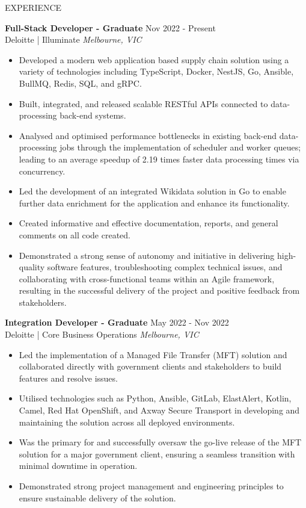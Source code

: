 \documentclass{resume} %
\begin{document}
\begin{rSection}{EXPERIENCE}

\textbf{Full-Stack Developer - Graduate} \hfill Nov 2022 - Present\\
Deloitte | Illuminate \hfill \textit{Melbourne, VIC}
 \begin{itemize}
    \itemsep -3pt {} 
    \item Developed a modern web application based supply chain solution using a variety of technologies including TypeScript, Docker, NestJS, Go, Ansible, BullMQ, Redis, SQL, and gRPC.
    \item Built, integrated, and released scalable RESTful APIs connected to data-processing back-end systems.
    \item Analysed and optimised performance bottlenecks in existing back-end data-processing jobs through the implementation of scheduler and worker queues; leading to an average speedup of 2.19 times faster data processing times via concurrency.
    \item Led the development of an integrated Wikidata solution in Go to enable further data enrichment for the application and enhance its functionality.
    \item Created informative and effective documentation, reports, and general comments on all code created.
    \item Demonstrated a strong sense of autonomy and initiative in delivering high-quality software features, troubleshooting complex technical issues, and collaborating with cross-functional teams within an Agile framework, resulting in the successful delivery of the project and positive feedback from stakeholders.
 \end{itemize}
 
\textbf{Integration Developer - Graduate} \hfill May 2022 - Nov 2022\\
Deloitte | Core Business Operations \hfill \textit{Melbourne, VIC}
 \begin{itemize}
    \itemsep -3pt {} 
    \item Led the implementation of a Managed File Transfer (MFT) solution and collaborated directly with government clients and stakeholders to build features and resolve issues.
    \item Utilised technologies such as Python, Ansible, GitLab, ElastAlert, Kotlin, Camel, Red Hat OpenShift, and Axway Secure Transport in developing and maintaining the solution across all deployed environments.
    \item Was the primary for and successfully oversaw the go-live release of the MFT solution for a major government client, ensuring a seamless transition with minimal downtime in operation.
    \item Demonstrated strong project management and engineering principles to ensure sustainable delivery of the solution.
 \end{itemize}


\end{rSection}
\end{document}
